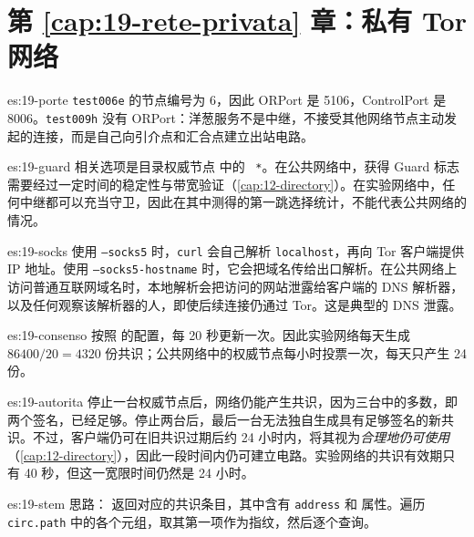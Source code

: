 \section*{第 \ref{cap:19-rete-privata} 章：私有 Tor 网络}

\begin{soluzione}{es:19-porte}
\texttt{test006e} 的节点编号为 6，因此 ORPort 是 5106，ControlPort 是 8006。\texttt{test009h} 没有 ORPort：洋葱服务不是中继，不接受其他网络节点主动发起的连接，而是自己向引介点和汇合点建立出站电路。
\end{soluzione}

\begin{soluzione}{es:19-guard}
相关选项是目录权威节点  中的 ~\texttt{*}。在公共网络中，获得 Guard 标志需要经过一定时间的稳定性与带宽验证（\cref{cap:12-directory}）。在实验网络中，任何中继都可以充当守卫，因此在其中测得的第一跳选择统计，不能代表公共网络的情况。
\end{soluzione}

\begin{soluzione}{es:19-socks}
使用 \texttt{--socks5} 时，\texttt{curl} 会自己解析 \texttt{localhost}，再向 Tor 客户端提供 IP 地址。使用 \texttt{--socks5-hostname} 时，它会把域名传给出口解析。在公共网络上访问普通互联网域名时，本地解析会把访问的网站泄露给客户端的 DNS 解析器，以及任何观察该解析器的人，即使后续连接仍通过 Tor。这是典型的 DNS 泄露。
\end{soluzione}

\begin{soluzione}{es:19-consenso}
按照  的配置，每 20 秒更新一次。因此实验网络每天生成 $86400/20=4320$ 份共识；公共网络中的权威节点每小时投票一次，每天只产生 24 份。
\end{soluzione}

\begin{soluzione}{es:19-autorita}
停止一台权威节点后，网络仍能产生共识，因为三台中的多数，即两个签名，已经足够。停止两台后，最后一台无法独自生成具有足够签名的新共识。不过，客户端仍可在旧共识过期后约 24 小时内，将其视为\emph{合理地仍可使用}（\cref{cap:12-directory}），因此一段时间内仍可建立电路。实验网络的共识有效期只有 40 秒，但这一宽限时间仍然是 24 小时。
\end{soluzione}

\begin{soluzione}{es:19-stem}
思路： 返回对应的共识条目，其中含有 \texttt{address} 和  属性。遍历 \texttt{circ.path} 中的各个元组，取其第一项作为指纹，然后逐个查询。
\end{soluzione}


